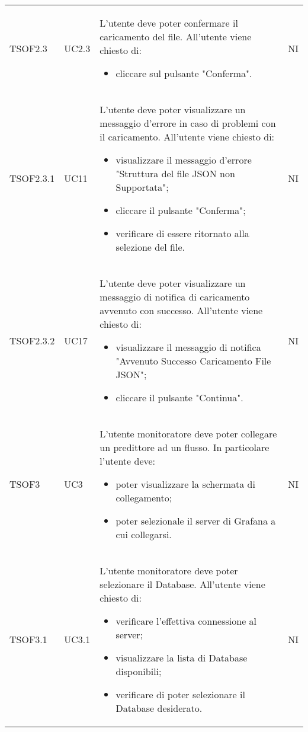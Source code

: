 \begin{longtable}{C{2.5cm} C{2.5cm} L{8cm} C{2cm}}
TSOF2.3 & UC2.3 &
L'utente deve poter confermare il caricamento del file. \newline All'utente viene chiesto di:
\begin{itemize}
	\item cliccare sul pulsante "Conferma".
\end{itemize} & NI	\\


TSOF2.3.1 & UC11 &
L'utente deve poter visualizzare un messaggio d'errore in caso di problemi con il caricamento. \newline All'utente viene chiesto di:
\begin{itemize}
	\item visualizzare il messaggio d'errore "Struttura del file JSON non Supportata";
	\item cliccare il pulsante "Conferma";
	\item verificare di essere ritornato alla selezione del file.
\end{itemize} & NI	\\

TSOF2.3.2 & UC17 &
L'utente deve poter visualizzare un messaggio di notifica di caricamento avvenuto con successo. \newline All'utente viene chiesto di:
\begin{itemize}
	\item visualizzare il messaggio di notifica "Avvenuto Successo Caricamento File JSON";
	\item cliccare il pulsante "Continua".
\end{itemize} & NI	\\
TSOF3 & 
UC3 &
L'utente monitoratore deve poter collegare un predittore ad un flusso. In particolare l'utente deve:
\begin{itemize}
	\item poter visualizzare la schermata di collegamento;
	\item poter selezionale il server di Grafana a cui collegarsi.
\end{itemize} &
NI \\ 

TSOF3.1 &
UC3.1 &
L'utente monitoratore deve poter selezionare il Database. All'utente viene chiesto di:
\begin{itemize}
	\item verificare l'effettiva connessione al server;
	\item visualizzare la lista di Database disponibili;
	\item verificare di poter selezionare il Database desiderato.
\end{itemize}&
NI \\


\end{longtable}
